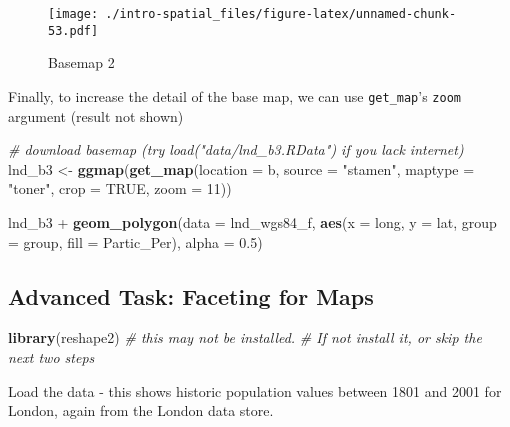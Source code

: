 \documentclass[]{article}
\newenvironment{Shaded}{}{}
\newcommand{\KeywordTok}[1]{\textcolor[rgb]{0.00,0.44,0.13}{\textbf{{#1}}}}
\newcommand{\DataTypeTok}[1]{\textcolor[rgb]{0.56,0.13,0.00}{{#1}}}
\newcommand{\DecValTok}[1]{\textcolor[rgb]{0.25,0.63,0.44}{{#1}}}
\newcommand{\FloatTok}[1]{\textcolor[rgb]{0.25,0.63,0.44}{{#1}}}
\newcommand{\StringTok}[1]{\textcolor[rgb]{0.25,0.44,0.63}{{#1}}}
\newcommand{\CommentTok}[1]{\textcolor[rgb]{0.38,0.63,0.69}{\textit{{#1}}}}
\newcommand{\OtherTok}[1]{\textcolor[rgb]{0.00,0.44,0.13}{{#1}}}
\newcommand{\NormalTok}[1]{{#1}}
\begin{document}
\begin{figure}[htbp]
\centering
\texttt{[image: ./intro-spatial\_files/figure-latex/unnamed-chunk-53.pdf]}
\caption{Basemap 2}
\end{figure}

Finally, to increase the detail of the base map, we can use
\texttt{get\_map}'s \texttt{zoom} argument (result not shown)

\begin{Shaded}
\begin{Highlighting}[]
\CommentTok{# download basemap (try load("data/lnd_b3.RData") if you lack internet)}
\NormalTok{lnd_b3 <-}\StringTok{ }\KeywordTok{ggmap}\NormalTok{(}\KeywordTok{get_map}\NormalTok{(}\DataTypeTok{location =} \NormalTok{b, }\DataTypeTok{source =} \StringTok{"stamen"}\NormalTok{,}
  \DataTypeTok{maptype =} \StringTok{"toner"}\NormalTok{, }\DataTypeTok{crop =} \OtherTok{TRUE}\NormalTok{, }\DataTypeTok{zoom =} \DecValTok{11}\NormalTok{))}
\end{Highlighting}
\end{Shaded}

\begin{Shaded}
\begin{Highlighting}[]
\NormalTok{lnd_b3 +}
\StringTok{  }\KeywordTok{geom_polygon}\NormalTok{(}\DataTypeTok{data =} \NormalTok{lnd_wgs84_f,}
               \KeywordTok{aes}\NormalTok{(}\DataTypeTok{x =} \NormalTok{long, }\DataTypeTok{y =} \NormalTok{lat, }\DataTypeTok{group =} \NormalTok{group, }\DataTypeTok{fill =} \NormalTok{Partic_Per),}
               \DataTypeTok{alpha =} \FloatTok{0.5}\NormalTok{)}
\end{Highlighting}
\end{Shaded}

\subsection{Advanced Task: Faceting for
Maps}\label{advanced-task-faceting-for-maps}

\begin{Shaded}
\begin{Highlighting}[]
\KeywordTok{library}\NormalTok{(reshape2) }\CommentTok{# this may not be installed.}
\CommentTok{# If not install it, or skip the next two steps}
\end{Highlighting}
\end{Shaded}

Load the data - this shows historic population values between 1801 and
2001 for London, again from the London data store.
\end{document}
